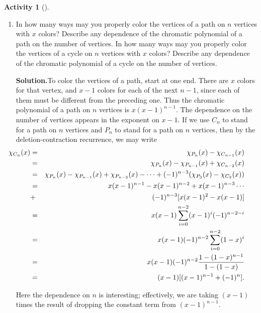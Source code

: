 \documentclass[10pt,]{book}
\theoremstyle{plain}
\theoremstyle{definition}
\newtheorem{activity}[project]{Activity}
\numberwithin{equation}{chapter}
\newcommand{\amp}{&}
\begin{document}
\begin{activity}[]\label{activity-116}
~\par
\begin{enumerate}[label=(\alph*)]
 \item In how many ways may you properly color the vertices of a path on \(n\) vertices with \(x\) colors? Describe any dependence of the chromatic polynomial of a path on the number of vertices. In how many ways may you properly color the vertices of a cycle on \(n\) vertices with \(x\) colors? Describe any dependence of the chromatic polynomial of a cycle on the number of vertices.%
\par\medskip\noindent%
\textbf{Solution.}\quad To color the vertices of a path, start at one end. There are \(x\) colors for that vertex, and \(x-1\) colors for each of the next \(n-1\), since each of them must be different from the preceding one. Thus the chromatic polynomial of a path on \(n\) vertices is \(x(x-1)^{n-1}\). The dependence on the number of vertices appears in the exponent on \(x-1\). If we use \(C_n\) to stand for a path on \(n\) vertices and \(P_n\) to stand for a path on \(n\) vertices, then by the deletion-contraction recurrence, we may write%
\begin{align*}
\hspace{-.4 in}\chi_{C_n}(x) \amp =\amp
\chi_{P_n}(x)-\chi_{C_{n-1}}(x)\\
\amp =\amp \chi_{P_n}(x)-\chi_{P_{n-1}}(x)+\chi_{C_{n-2}}(x)\\
\amp =\amp
\chi_{P_n}(x)-\chi_{P_{n-1}}(x)+\chi_{P_{n-3}}(x)-
\cdots+(-1)^{n-3}(\chi_{P_3}(x)-\chi_{C_2}(x))\\
\amp =\amp x(x-1)^{n-1}-x(x-1)^{n-2}+x(x-1)^{n-3}\cdots\\
\amp +\amp (-1)^{n-3}[x(x-1)^2-x(x-1)]\\
\amp =\amp x(x-1)\sum_{i=0}^{n-2}(x-1)^i(-1)^{n-2-i}\\
\amp =\amp x(x-1)(-1)^{n-2}\sum_{i=0}^{n-2}(1-x)^i\\
\amp =\amp x(x-1)(-1)^{n-2}{1-(1-x)^{n-1}\over 1-(1-x)}\\
\amp =\amp (x-1)[(x-1)^{n-1}+(-1)^n].
\end{align*}
%
\par
Here the dependence on \(n\) is interesting; effectively, we are taking \((x-1)\) times the result of dropping the constant term from \((x-1)^{n-1}\).%


\end{enumerate}
\end{activity}
\end{document}
